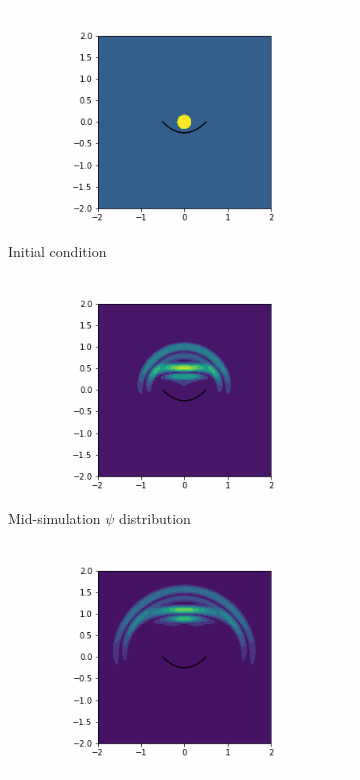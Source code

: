 \documentclass{article}
\begin{document}
\begin{figure}[h]
  \begin{subfigure}[b]{0.45\textwidth}
    \includegraphics[width=\textwidth]{figures/parabolic-dish-0}
    \caption{Initial condition}
    \label{fig:para-init}
  \end{subfigure}
  \begin{subfigure}[b]{0.45\textwidth}
    \includegraphics[width=\textwidth]{figures/parabolic-dish-100}
    \caption{Mid-simulation $\psi$ distribution}
    \label{fig:para-mid}
  \end{subfigure}
  \begin{subfigure}[b]{0.45\textwidth}
    \includegraphics[width=\textwidth]{figures/parabolic-dish-160}

\end{subfigure}
\end{figure}
\end{document}
